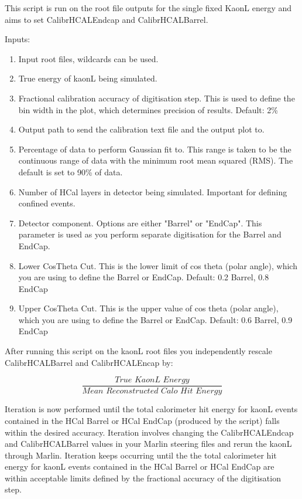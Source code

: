 \documentclass[11pt, oneside]{article}   	%
\begin{document}
This script is run on the root file outputs for the single fixed KaonL energy and aims to set CalibrHCALEndcap and CalibrHCALBarrel.

Inputs:
\begin{enumerate}
\item Input root files, wildcards can be used.
\item True energy of kaonL being simulated.
\item Fractional calibration accuracy of digitisation step.  This is used to define the bin width in the plot, which determines precision of results.  Default: 2\%
\item Output path to send the calibration text file and the output plot to.
\item Percentage of data to perform Gaussian fit to.  This range is taken to be the continuous range of data with the minimum root mean squared (RMS).  The default is set to 90\% of data.
\item Number of HCal layers in detector being simulated.  Important for defining confined events.
\item Detector component.  Options are either "Barrel" or "EndCap".  This parameter is used as you perform separate digitisation for the Barrel and EndCap.
\item Lower CosTheta Cut.  This is the lower limit of cos theta (polar angle), which you are using to define the Barrel or EndCap.  Default: 0.2 Barrel, 0.8 EndCap
\item Upper CosTheta Cut.  This is the upper value of cos theta (polar angle), which you are using to define the Barrel or EndCap.  Default: 0.6 Barrel, 0.9 EndCap
\end{enumerate}

After running this script on the kaonL root files you independently rescale CalibrHCALBarrel and CalibrHCALEncap by:

\begin{equation}
\frac{\textit{True KaonL Energy}}{\textit{Mean Reconstructed Calo Hit Energy}}
\end{equation}

Iteration is now performed until the total calorimeter hit energy for kaonL events contained in the HCal Barrel or HCal EndCap (produced by the script) falls within the desired accuracy.  Iteration involves changing the CalibrHCALEndcap and CalibrHCALBarrel values in your Marlin steering files and rerun the kaonL through Marlin.  Iteration keeps occurring until the the total calorimeter hit energy for kaonL events contained in the HCal Barrel or HCal EndCap are within acceptable limits defined by the fractional accuracy of the digitisation step.
\end{document}
